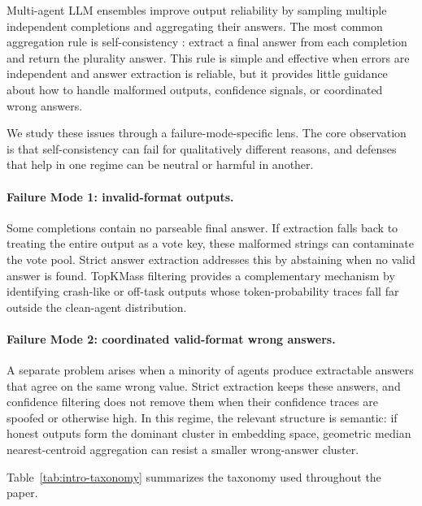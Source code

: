 \documentclass[11pt]{article}
\begin{document}
Multi-agent LLM ensembles improve output reliability by sampling multiple
independent completions and aggregating their answers. The most common
aggregation rule is self-consistency \citep{wang2023self}: extract a final answer
from each completion and return the plurality answer. This rule is simple and
effective when errors are independent and answer extraction is reliable, but it
provides little guidance about how to handle malformed outputs, confidence
signals, or coordinated wrong answers.

We study these issues through a failure-mode-specific lens. The core observation
is that self-consistency can fail for qualitatively different reasons, and
defenses that help in one regime can be neutral or harmful in another.

\paragraph{Failure Mode 1: invalid-format outputs.}
Some completions contain no parseable final answer. If extraction falls back to
treating the entire output as a vote key, these malformed strings can contaminate
the vote pool. Strict answer extraction addresses this by abstaining when no
valid answer is found. TopKMass filtering provides a complementary mechanism by
identifying crash-like or off-task outputs whose token-probability traces fall
far outside the clean-agent distribution.

\paragraph{Failure Mode 2: coordinated valid-format wrong answers.}
A separate problem arises when a minority of agents produce extractable answers
that agree on the same wrong value. Strict extraction keeps these answers, and
confidence filtering does not remove them when their confidence traces are
spoofed or otherwise high. In this regime, the relevant structure is semantic:
if honest outputs form the dominant cluster in embedding space, geometric median
nearest-centroid aggregation can resist a smaller wrong-answer cluster.

Table~\ref{tab:intro-taxonomy} summarizes the taxonomy used throughout the paper.
\end{document}
